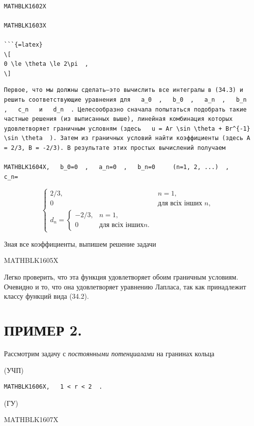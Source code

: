 \documentclass[
]{article}
\begin{document}
\begin{verbatim}

MATHBLK1602X

MATHBLK1603X

```{=latex}
\[
0 \le \theta \le 2\pi  ,
\]
\end{verbatim}

\begin{verbatim}
Первое, что мы должны сделать—это вычислить все интегралы в (34.3) и решить соответствующие уравнения для   a_0  ,   b_0  ,   a_n  ,   b_n  ,   c_n   и   d_n  . Целесообразно сначала попытаться подобрать такие частные решения (из выписанных выше), линейная комбинация которых удовлетворяет граничным условням (здесь   u = Ar \sin \theta + Br^{-1} \sin \theta  ). Затем из граничных условий найти коэффициенты (здесь A = 2/3, B = -2/3). В результате этих простых вычислений получаем

MATHBLK1604X,   b_0=0  ,   a_n=0  ,   b_n=0     (n=1, 2, ...)  ,   c_n=
\end{verbatim}

\[
\begin{cases} 2/3, & n=1, \\0 & \text{для всіх інших } n, \\ d_n=\begin{cases} -2/3, & n=1, \\0 & \text{для всіх інших} n. \end{cases} \end{cases}
\]

Зная все коэффициенты, выпишем решение задачи

MATHBLK1605X

Легко проверить, что эта функция удовлетворяет обоим граничным условиям.
Очевидно и то, что она удовлетворяет уравнению Лапласа, так как
принадлежит классу функций вида (34.2).

\section{ПРИМЕР 2.}\label{ux43fux440ux438ux43cux435ux440-2.}

Рассмотрим задачу с \emph{постоянными потенциалами} на гранинах кольца

(УЧП)

\begin{verbatim}
MATHBLK1606X,   1 < r < 2  .
\end{verbatim}

(ГУ)

MATHBLK1607X
\end{document}
